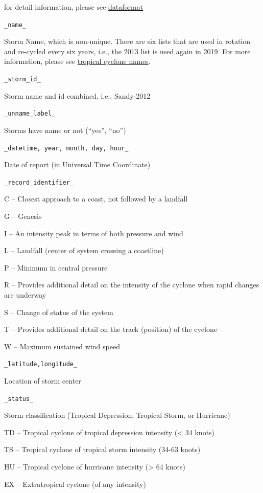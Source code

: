 \documentclass[]{book}
\begin{document}
for detail information, please see \href{https://www.nhc.noaa.gov/data/hurdat/hurdat2-format-atlantic.pdf}{dataformat}

\texttt{\_name\_}

Storm Name, which is non-unique. There are six lists that are used in rotation and re-cycled every six years, i.e., the 2013 list is used again in 2019. For more information, please see \href{https://www.nhc.noaa.gov/aboutnames.shtml}{tropical cyclone names}.

\texttt{\_storm\_id\_}

Storm name and id combined, i.e., Sandy-2012

\texttt{\_unname\_label\_}

Storms have name or not (``yes'', ``no'')

\texttt{\_datetime,\ year,\ month,\ day,\ hour\_}

Date of report (in Universal Time Coordinate)

\texttt{\_record\_identifier\_}

C -- Closest approach to a coast, not followed by a landfall

G -- Genesis

I -- An intensity peak in terms of both pressure and wind

L -- Landfall (center of system crossing a coastline)

P -- Minimum in central pressure

R -- Provides additional detail on the intensity of the cyclone when rapid changes are underway

S -- Change of status of the system

T -- Provides additional detail on the track (position) of the cyclone

W -- Maximum sustained wind speed

\texttt{\_latitude,longitude\_}

Location of storm center

\texttt{\_status\_}

Storm classification (Tropical Depression, Tropical Storm, or Hurricane)

TD -- Tropical cyclone of tropical depression intensity (\textless{} 34 knots)

TS -- Tropical cyclone of tropical storm intensity (34-63 knots)

HU -- Tropical cyclone of hurricane intensity (\textgreater{} 64 knots)

EX -- Extratropical cyclone (of any intensity)
\end{document}
